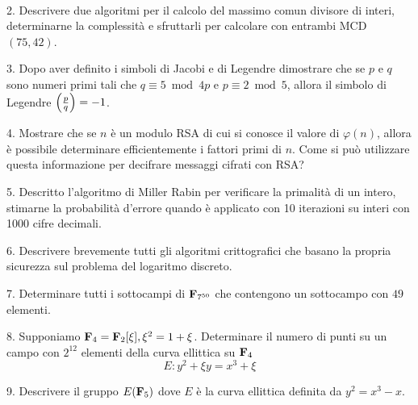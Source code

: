 \ \dotfill\ \bigskip\bigskip\bigskip\vfil\eject

\item{2.} Descrivere due algoritmi per il calcolo del massimo comun divisore di interi, determinarne la complessit\`a e sfruttarli
per calcolare con entrambi MCD$(75,42)$.\vv

\item{3.} Dopo aver definito i simboli di Jacobi e di Legendre dimostrare che se $p$ e $q$ sono numeri primi tali che $q\equiv5\bmod 4p$ e 
$p\equiv2\bmod5$, allora il simbolo di Legendre $\left({p\over q}\right)=-1$. \vv

\item{4.} Mostrare che se $n$ \`e un modulo RSA di cui si conosce il valore di $\varphi(n)$, allora \`e possibile
determinare efficientemente i fattori primi di $n$. Come si pu\`o utilizzare questa informazione
per decifrare messaggi cifrati con RSA?\ve\ \vs

\item{5.} Descritto l'algoritmo di Miller Rabin per verificare la primalit\`a di un intero, stimarne la probabilit\`a
d'errore quando \`e applicato con 10 iterazioni su interi con 1000 cifre decimali.\vv

\item{6.} Descrivere brevemente tutti gli algoritmi crittografici che basano la propria sicurezza sul problema del logaritmo
discreto.\vv

\item{7.} Determinare tutti i sottocampi di ${\bf F}_{7^{50}}$ che contengono un sottocampo con $49$ elementi.\ve\ \vs

\item{8.} Supponiamo ${\bf F}_4={\bf F}_2[\xi], \xi^2=1+\xi$. 
Determinare il numero di punti su un campo con $2^{12}$ elementi della curva ellittica su ${\bf F}_4$ 
$$E: y^2+\xi y=x^3+\xi$$\vv

\item{9.} Descrivere il gruppo $E({\bf F}_5)$ dove $E$ \`e la curva ellittica definita da $y^2=x^3-x$.\ \vst\bye
